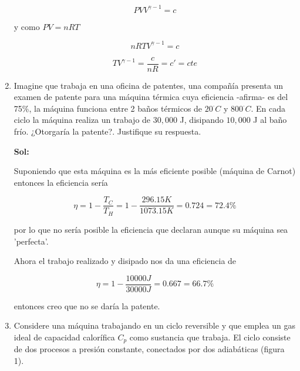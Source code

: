 \documentclass[12pt,a4paper]{article}
\begin{document}
\begin{enumerate}
    \begin{equation*}
        PV V^{\gamma - 1} = c
    \end{equation*}
    
    y como $PV = nR T$
    
    \begin{equation*}
        nR T V^{\gamma - 1} = c
    \end{equation*}
    
    \begin{equation*}
        T V^{\gamma - 1} = \frac{c}{nR} = c' = cte 
    \end{equation*}
    

    
    
    
    
    
    
    \item Imagine que trabaja en una oficina de patentes, una compañía presenta un examen de patente para una máquina térmica cuya eficiencia -afirma- es del 75\%, la máquina funciona entre 2 baños térmicos de $20^{\cdot} C$ y $800^{\cdot}C$. En cada ciclo la máquina realiza un trabajo de $30,000 $ J, disipando $10, 000$ J al baño frío. ¿Otorgaría la patente?. Justifique su respuesta.
    
    \textbf{Sol:}
    
    Suponiendo que esta máquina es la más eficiente posible (máquina de Carnot) entonces la eficiencia sería
    
    \begin{equation*}
        \eta = 1 - \frac{T_C}{T_H} = 1 - \frac{296.15 K}{1073.15 K} = 0.724 = 72.4 \%
    \end{equation*}
    
    por lo que no sería posible la eficiencia que declaran aunque su máquina sea 'perfecta'.
    
    Ahora el trabajo realizado y disipado nos da una eficiencia de
    
    \begin{equation*}
        \eta = 1 - \frac{10000 J}{30000 J} = 0.667 = 66.7 \%
    \end{equation*}
    
    entonces creo que no se daría la patente.
    
    
    
    
    
    
    \item Considere una máquina trabajando en un ciclo reversible y que emplea un gas ideal de capacidad calorífica $C_p$ como sustancia que trabaja. El ciclo consiste de dos procesos a presión constante, conectados por dos adiabáticas (figura 1).
    

\end{enumerate}
\end{document}
